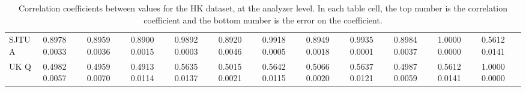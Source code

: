 \begin{landscape}
\begin{table}
\begin{tabularx}{1\linewidth}{@{\extracolsep{\fill}}lXXXXXXXXXXX}
	SJTU A & 0.8978 0.0033 & 0.8959 0.0036 & 0.8900 0.0015 & 0.9892 0.0003 & 0.8920 0.0046 & 0.9918 0.0005 & 0.8949 0.0018 & 0.9935 0.0001 & 0.8984 0.0037 & 1.0000 0.0000 & 0.5612 0.0141  \\
	UK Q   & 0.4982 0.0057 & 0.4959 0.0070 & 0.4913 0.0114 & 0.5635 0.0137 & 0.5015 0.0021 & 0.5642 0.0115 & 0.5066 0.0020 & 0.5637 0.0121 & 0.4987 0.0059 & 0.5612 0.0141 & 1.0000 0.0000  \\
  \bottomrule
\end{tabularx}
\caption[]{Correlation coefficients between \R values for the HK dataset, at the analyzer level. In each table cell, the top number is the correlation coefficient and the bottom number is the error on the coefficient.}
\label{tab:Corrs_HK_analyzer}
\end{table}
\end{landscape}


